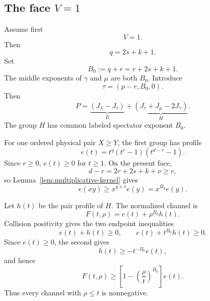 \documentclass[11pt]{article}
\theoremstyle{definition}
\begin{document}
\subsection{The face \texorpdfstring{\(V=1\)}{V = 1}}

Assume first
\begin{equation*}
V=1.
\end{equation*}
Then
\begin{equation*}
q=2s+k+1.
\end{equation*}
Set
\begin{equation*}
B_0:=q+r=r+2s+k+1.
\end{equation*}
The middle exponents of \(\gamma\) and \(\mu\) are both \(B_0\).  Introduce
\begin{equation*}
\tau=(p-r,B_0,0).
\end{equation*}
Then
\begin{equation*}
P
=
\underbrace{(J_\lambda-J_\tau)}_{E}
+
\underbrace{(J_\tau+J_\mu-2J_\gamma)}_{H}.
\end{equation*}
The group \(H\) has common labeled spectator exponent \(B_0\).

For one ordered physical pair \(X\ge Y\), the first group has profile
\begin{equation*}
e(t)
=
t^q(t^r-1)(t^{d-r}-1).
\end{equation*}
Since \(r\ge0\), \(e(t)\ge0\) for \(t\ge1\).  On the present face,
\begin{equation*}
d-r=2r+2s+k+\nu\ge r,
\end{equation*}
so Lemma~\ref{lem:multiplicative-kernel} gives
\begin{equation*}
e(xy)\ge x^{q+r}e(y)=x^{B_0}e(y).
\end{equation*}

Let \(h(t)\) be the pair profile of \(H\).  The normalized channel is
\begin{equation*}
F(t,\rho)=e(t)+\rho^{B_0}h(t).
\end{equation*}
Collision positivity gives the two endpoint inequalities
\begin{equation*}
e(t)+h(t)\ge0,
\qquad
e(t)+t^{B_0}h(t)\ge0.
\end{equation*}
Since \(e(t)\ge0\), the second gives
\begin{equation*}
h(t)\ge-t^{-B_0}e(t),
\end{equation*}
and hence
\begin{equation*}
F(t,\rho)
\ge
\left[
1-\left(\frac{\rho}{t}\right)^{B_0}
\right]e(t).
\end{equation*}
Thus every channel with \(\rho\le t\) is nonnegative.
\end{document}
